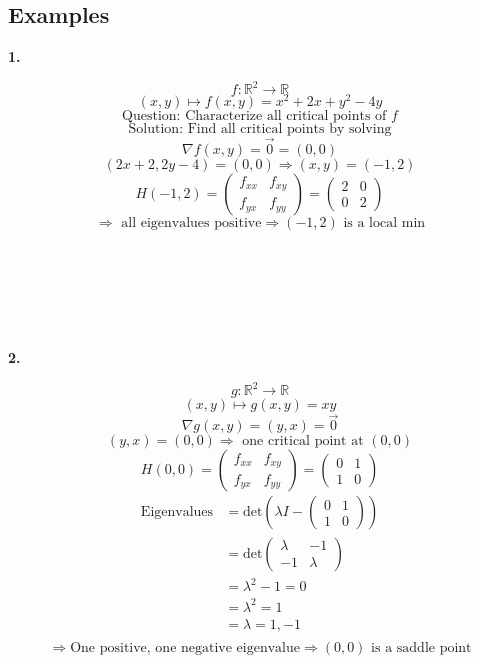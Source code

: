 \documentclass[12pt]{article}
\newcommand{\BR}{\mathbb R}
\newenvironment{statement}[1]{\smallskip\noindent\color[rgb]{0.50,0.00,1.00} {\bf #1.}}{}
\begin{document}
\subsection{Examples}
\begin{statement}{1}

\end{statement}
\[ f: \BR^2 \rightarrow\BR \]
\[ (x,y)\mapsto f(x,y)=x^2+2x+y^2-4y \]
\[ \text{Question: Characterize all critical points of }f \]
\[ \text{Solution: Find all critical points by solving} \]
\[ \nabla f(x,y) = \vec{0} = (0,0) \]
\[ (2x+2, 2y-4) = (0,0)\Rightarrow(x,y)=(-1,2) \]
\[ H(-1,2) =
\begin{pmatrix}
  f_{xx} & f_{xy} \\
  f_{yx} & f_{yy}
\end{pmatrix}
= \begin{pmatrix}
  2 & 0 \\
  0 & 2
\end{pmatrix}
\]
\[\Rightarrow\text{ all eigenvalues positive}\Rightarrow (-1,2)\text{ is a local min} \]
\\
\\
\\
\\
\\
\\
\begin{statement}{2}

\end{statement}
\[ g: \BR^2\rightarrow\BR \]
\[ (x,y)\mapsto g(x,y)=xy \]
\[ \nabla g(x,y)=(y,x)=\vec{0} \]
\[ (y,x) = (0,0)\Rightarrow\text{ one critical point at }(0,0) \]
\[
H(0,0) =
\begin{pmatrix}
  f_{xx} & f_{xy} \\
  f_{yx} & f_{yy}
\end{pmatrix}
=
\begin{pmatrix}
  0 & 1 \\
  1 & 0
\end{pmatrix}
\]
\begin{align*}
  \text{Eigenvalues} & = \text{det} (\lambda I-\begin{pmatrix} 0 & 1 \\ 1 & 0 \end{pmatrix}) \\
  & = \text{det}\begin{pmatrix} \lambda & -1 \\ -1 & \lambda \end{pmatrix} \\
  & = \lambda^2 - 1 = 0 \\
  & = \lambda^2 = 1 \\
  & = \lambda = 1,-1 \\
\end{align*}
\[ \Rightarrow \text{One positive, one negative eigenvalue}\Rightarrow(0,0)\text{ is a saddle point} \]
\end{document}
